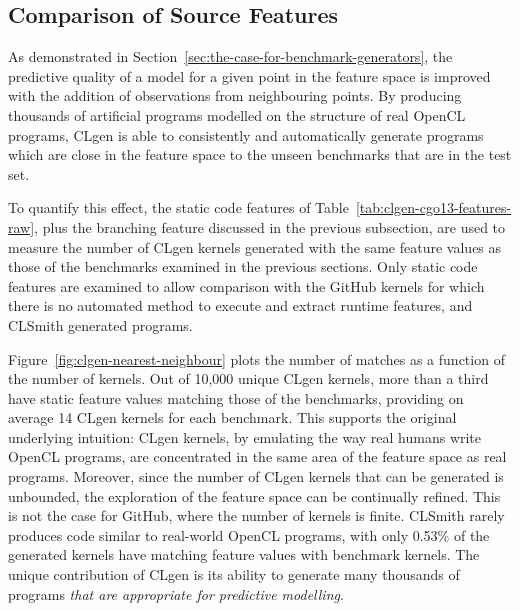 \subsection{Comparison of Source Features}

As demonstrated in Section~\ref{sec:the-case-for-benchmark-generators}, the predictive quality of a model for a given point in the feature space is improved with the addition of observations from neighbouring points. By producing thousands of artificial programs modelled on the structure of real OpenCL programs, CLgen is able to consistently and automatically generate programs which are close in the feature space to the unseen benchmarks that are in the test set.

To quantify this effect, the static code features of Table~\ref{tab:clgen-cgo13-features-raw}, plus the branching feature discussed in the previous subsection, are used to measure the number of CLgen kernels generated with the same feature values as those of the benchmarks examined in the previous sections. Only static code features are examined to allow comparison with the GitHub kernels for which there is no automated method to execute and extract runtime features, and CLSmith generated programs.

Figure~\ref{fig:clgen-nearest-neighbour} plots the number of matches as a function of the number of kernels. Out of 10,000 unique CLgen kernels, more than a third have static feature values matching those of the benchmarks, providing on average 14 CLgen kernels for each benchmark. This supports the original underlying intuition: CLgen kernels, by emulating the way real humans write OpenCL programs, are concentrated in the same area of the feature space as real programs. Moreover, since the number of CLgen kernels that can be generated is unbounded, the exploration of the feature space can be continually refined. This is not the case for GitHub, where the number of kernels is finite. CLSmith rarely produces code similar to real-world OpenCL programs, with only 0.53\% of the generated kernels have matching feature values with benchmark kernels. The unique contribution of CLgen is its ability to generate many thousands of programs \textit{that are appropriate for predictive modelling}.

